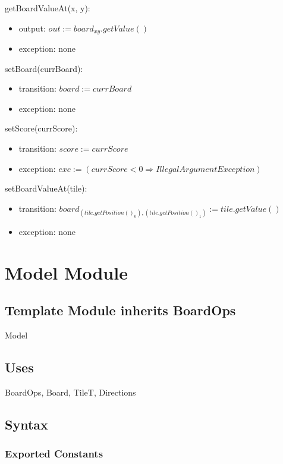 \documentclass[12pt]{article}
\begin{document}
\noindent getBoardValueAt(x, y):
\begin{itemize}
\item output: $out := board_{xy}.getValue()$
\item exception: none
\end{itemize}

\noindent setBoard(currBoard):
\begin{itemize}
\item transition: $board := \mathit{currBoard}$
\item exception: none
\end{itemize}

\noindent setScore(currScore):
\begin{itemize}
\item transition: $score := \mathit{currScore}$
\item exception: $exc := (currScore < 0 \Rightarrow IllegalArgumentException)$
\end{itemize}

\noindent setBoardValueAt(tile):
\begin{itemize}
\item transition: $board_{(tile.getPosition()_0), (tile.getPosition()_1)} := tile.getValue()$
\item exception: none
\end{itemize}

\newpage

\section* {Model Module}

\subsection*{Template Module inherits BoardOps}

Model

\subsection* {Uses}

BoardOps, Board, TileT, Directions

\subsection* {Syntax}

\subsubsection* {Exported Constants}
\end{document}
